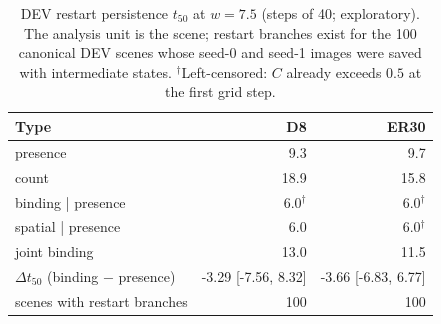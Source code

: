 \begin{table}[t]\centering\small
\caption{DEV restart persistence $t_{50}$ at $w=7.5$ (steps of 40; exploratory). The analysis unit is the scene; restart branches exist for the 100 canonical DEV scenes whose seed-0 and seed-1 images were saved with intermediate states. $^{\dagger}$Left-censored: $C$ already exceeds $0.5$ at the first grid step.}\label{tab:dev-t50}
\begin{tabular}{lrr}
\toprule
Type & D8 & ER30 \\
\midrule
presence & 9.3 & 9.7 \\
count & 18.9 & 15.8 \\
binding | presence & 6.0$^{\dagger}$ & 6.0$^{\dagger}$ \\
spatial | presence & 6.0 & 6.0$^{\dagger}$ \\
joint binding & 13.0 & 11.5 \\
$\Delta t_{50}$ (binding $-$ presence) & -3.29 [-7.56, 8.32] & -3.66 [-6.83, 6.77] \\
scenes with restart branches & 100 & 100 \\
\bottomrule
\end{tabular}
\end{table}
